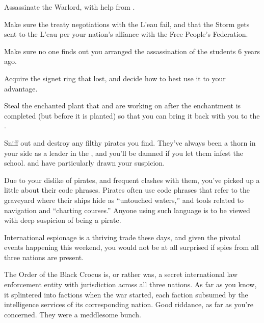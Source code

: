 \documentclass[char]{GL2020}
\begin{document}
\begin{itemz}
	\item Assassinate the \pShippies{} Warlord, \cLoud{\full} with help from \cDiplomat{}.
	\item Make sure the treaty negotiations with the L'eau fail, and that the Storm gets sent to the L'eau per your nation's alliance with the Free People's Federation.
	\item Make sure no one finds out you arranged the assassination of the students 6 years ago.
	\item Acquire the \pFarm{} signet ring that \cPrince{} lost, and decide how to best use it to your advantage. 
	\item Steal the enchanted plant that \cCurse{} and \cFlowPriest{} are working on after the enchantment is completed (but before it is planted) so that you can bring it back with you to the \pFarm{}. %
	\item Sniff out and destroy any filthy pirates you find. They've always been a thorn in your side as a leader in the \pFarm{}, and you'll be damned if you let them infest the school. \cPirateChild{} and \cJuniorStatesman{} have particularly drawn your suspicion.
\end{itemz}

\begin{itemz}[Notes]
	\item Due to your dislike of pirates, and frequent clashes with them, you've picked up a little about their code phrases. Pirates often use code phrases that refer to the graveyard where their ships hide as ``untouched waters,'' and tools related to navigation and ``charting courses.'' Anyone using such language is to be viewed with deep suspicion of being a pirate.
	\item International espionage is a thriving trade these days, and given the pivotal events happening this weekend, you would not be at all surprised if spies from all three nations are present. 
	\item The Order of the Black Crocus is, or rather was, a secret international law enforcement entity with jurisdiction across all three nations. As far as you know, it splintered into factions when the war started, each faction subsumed by the intelligence services of its corresponding nation. Good riddance, as far as you're concerned. They were a meddlesome bunch.
\end{itemz}
\end{document}
